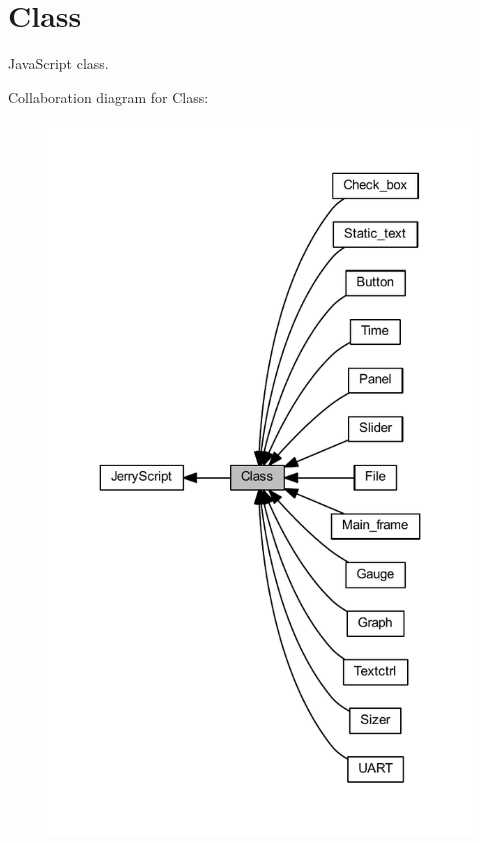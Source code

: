 \section{Class}
\label{group___class}


Java\+Script class.  


Collaboration diagram for Class\+:\nopagebreak
\begin{figure}[H]
\begin{center}
\leavevmode
\includegraphics[width=323pt]{group___class}
\end{center}
\end{figure}

